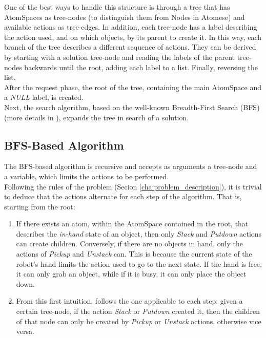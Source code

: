 One of the best ways to handle this structure is through a tree that has AtomSpaces as tree-nodes (to distinguish them from Nodes in Atomese) and available actions as tree-edges.
In addition, each tree-node has a label describing the action used, and on which objects, by its parent to create it.
In this way, each branch of the tree describes a different sequence of actions. They can be derived by starting with a solution tree-node and reading the labels of the parent tree-nodes backwards until the root, adding each label to a list. Finally, reversing the list.  \\

After the request phase, the root of the tree, containing the main AtomSpace and a \textit{NULL} label, is created. \\
Next, the search algorithm, based on the well-known Breadth-First Search (BFS) (more details in \cite{BFS-wiki, BFS}), expands the tree in search of a solution.

\subsection{BFS-Based Algorithm}\label{sec:bfs_search}

The BFS-based algorithm is recursive and accepts as arguments a tree-node and a variable, which limits the actions to be performed. \\
Following the rules of the problem (Secion \ref{cha:problem_description}), it is trivial to deduce that the actions alternate for each step of the algorithm.
That is, starting from the root:

\begin{enumerate} 
	\item If there exists an atom, within the AtomSpace contained in the root, that describes the \textit{in-hand} state of an object, then only \textit{Stack} and \textit{Putdown} actions can create children. Conversely, if there are no objects in hand, only the actions of \textit{Pickup} and \textit{Unstack} can. This is because the current state of the robot's hand limits the action used to go to the next state. If the hand is free, it can only grab an object, while if it is busy, it can only place the object down.

	\item From this first intuition, follows the one applicable to each step: given a certain tree-node, if the action \textit{Stack} or \textit{Putdown} created it, then the children of that node can only be created by \textit{Pickup} or \textit{Unstack} actions, otherwise vice versa.
\end{enumerate}

